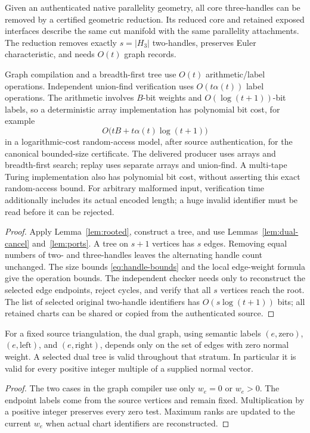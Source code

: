 \begin{theorem}\label{thm:native}
Given an authenticated native parallelity geometry, all core three-handles
can be removed by a certified geometric reduction.  Its reduced core and
retained exposed interfaces describe the same cut manifold with the same
parallelity attachments.  The reduction removes exactly $s=|H_3|$
two-handles, preserves Euler characteristic, and needs $O(t)$ graph records.

Graph compilation and a breadth-first tree use $O(t)$ arithmetic/label
operations.  Independent union-find verification uses
$O(t\alpha(t))$ label operations.  The arithmetic involves $B$-bit weights
and $O(\log(t+1))$-bit labels, so a deterministic array implementation has
polynomial bit cost, for example
\[
 O\bigl(tB+t\alpha(t)\log(t+1)\bigr)
\]
in a logarithmic-cost random-access model, after source authentication,
for the canonical bounded-size certificate.  The delivered producer uses
arrays and breadth-first search; replay uses separate arrays and union-find.
A multi-tape Turing implementation also has polynomial bit cost, without
asserting this exact random-access bound.  For arbitrary malformed input,
verification time additionally includes its actual encoded length; a huge
invalid identifier must be read before it can be rejected.
\end{theorem}
\begin{proof}
Apply Lemma~\ref{lem:rooted}, construct a tree, and use
Lemmas~\ref{lem:dual-cancel} and~\ref{lem:ports}.  A tree on $s+1$ vertices
has $s$ edges.  Removing equal numbers of two- and three-handles leaves the
alternating handle count unchanged.  The size bounds
\eqref{eq:handle-bounds} and the local edge-weight formula give the operation
bounds.  The independent checker needs only to reconstruct the selected
edge endpoints, reject cycles, and verify that all $s$ vertices reach the
root.  The list of selected original two-handle identifiers has
$O(s\log(t+1))$ bits; all retained charts can be shared or copied from the
authenticated source.
\end{proof}

\begin{corollary}\label{cor:support}
For a fixed source triangulation, the dual graph, using semantic labels
$(e,\text{zero})$, $(e,\text{left})$, and $(e,\text{right})$, depends only
on the set of edges with zero normal weight.  A selected dual tree is valid
throughout that stratum.  In particular it is valid for every positive
integer multiple of a supplied normal vector.
\end{corollary}
\begin{proof}
The two cases in the graph compiler use only $w_e=0$ or $w_e>0$.
The endpoint labels come from the source vertices and remain fixed.
Multiplication by a positive integer preserves every zero test.  Maximum
ranks are updated to the current $w_e$ when actual chart identifiers are
reconstructed.
\end{proof}

